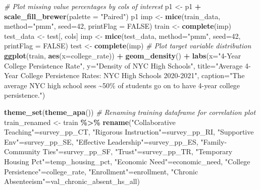 \documentclass[
  man,floatsintext]{apa6}
\newenvironment{Shaded}{\begin{snugshade}}{\end{snugshade}}
\newcommand{\AttributeTok}[1]{\textcolor[rgb]{0.13,0.29,0.53}{#1}}
\newcommand{\CommentTok}[1]{\textcolor[rgb]{0.56,0.35,0.01}{\textit{#1}}}
\newcommand{\ConstantTok}[1]{\textcolor[rgb]{0.56,0.35,0.01}{#1}}
\newcommand{\DecValTok}[1]{\textcolor[rgb]{0.00,0.00,0.81}{#1}}
\newcommand{\FunctionTok}[1]{\textcolor[rgb]{0.13,0.29,0.53}{\textbf{#1}}}
\newcommand{\NormalTok}[1]{#1}
\newcommand{\OtherTok}[1]{\textcolor[rgb]{0.56,0.35,0.01}{#1}}
\newcommand{\SpecialCharTok}[1]{\textcolor[rgb]{0.81,0.36,0.00}{\textbf{#1}}}
\newcommand{\StringTok}[1]{\textcolor[rgb]{0.31,0.60,0.02}{#1}}
\begin{document}
\begin{Shaded}
\begin{Highlighting}[]
\CommentTok{\# Plot missing value percentages by cols of interest}
\NormalTok{p1 }\OtherTok{\textless{}{-}}\NormalTok{ p1 }\SpecialCharTok{+} 
    \FunctionTok{scale\_fill\_brewer}\NormalTok{(}\AttributeTok{palette =} \StringTok{"Paired"}\NormalTok{)}
\NormalTok{p1}
\NormalTok{imp }\OtherTok{\textless{}{-}} \FunctionTok{mice}\NormalTok{(train\_data, }\AttributeTok{method=}\StringTok{"pmm"}\NormalTok{, }\AttributeTok{seed=}\DecValTok{42}\NormalTok{, }\AttributeTok{printFlag =} \ConstantTok{FALSE}\NormalTok{)}
\NormalTok{train }\OtherTok{\textless{}{-}} \FunctionTok{complete}\NormalTok{(imp)}
\NormalTok{test\_data }\OtherTok{\textless{}{-}}\NormalTok{ test[, cols]}
\NormalTok{imp }\OtherTok{\textless{}{-}} \FunctionTok{mice}\NormalTok{(test\_data, }\AttributeTok{method=}\StringTok{"pmm"}\NormalTok{, }\AttributeTok{seed=}\DecValTok{42}\NormalTok{, }\AttributeTok{printFlag =} \ConstantTok{FALSE}\NormalTok{)}
\NormalTok{test }\OtherTok{\textless{}{-}} \FunctionTok{complete}\NormalTok{(imp)}
\CommentTok{\# Plot target variable distribution}
\FunctionTok{ggplot}\NormalTok{(train, }\FunctionTok{aes}\NormalTok{(}\AttributeTok{x=}\NormalTok{college\_rate)) }\SpecialCharTok{+} 
    \FunctionTok{geom\_density}\NormalTok{() }\SpecialCharTok{+} 
    \FunctionTok{labs}\NormalTok{(}\AttributeTok{x=}\StringTok{"4{-}Year College Persistence Rate"}\NormalTok{,}
         \AttributeTok{y=}\StringTok{"Density of NYC High Schools"}\NormalTok{,}
         \AttributeTok{title=}\StringTok{"Average 4{-}Year College Persistence Rates: NYC High Schools 2020{-}2021"}\NormalTok{,}
         \AttributeTok{caption=}\StringTok{"The average NYC high school sees \textasciitilde{}50\% of students go on to have 4{-}year college persistence."}\NormalTok{)}

\FunctionTok{theme\_set}\NormalTok{(}\FunctionTok{theme\_apa}\NormalTok{())}
\CommentTok{\# Renaming training dataframe for correlation plot}
\NormalTok{train\_renamed }\OtherTok{\textless{}{-}}\NormalTok{ train }\SpecialCharTok{\%\textgreater{}\%}
  \FunctionTok{rename}\NormalTok{(}\StringTok{"Collaborative Teaching"}\OtherTok{=}\NormalTok{survey\_pp\_CT,}
         \StringTok{"Rigorous Instruction"}\OtherTok{=}\NormalTok{survey\_pp\_RI,}
         \StringTok{"Supportive Env"}\OtherTok{=}\NormalTok{survey\_pp\_SE,}
         \StringTok{"Effective Leadership"}\OtherTok{=}\NormalTok{survey\_pp\_ES,}
         \StringTok{"Family{-}Community Ties"}\OtherTok{=}\NormalTok{survey\_pp\_SF,}
         \StringTok{"Trust"}\OtherTok{=}\NormalTok{survey\_pp\_TR,}
         \StringTok{"Temporary Housing Pct"}\OtherTok{=}\NormalTok{temp\_housing\_pct,}
         \StringTok{"Economic Need"}\OtherTok{=}\NormalTok{economic\_need,}
         \StringTok{"College Persistence"}\OtherTok{=}\NormalTok{college\_rate,}
         \StringTok{"Enrollment"}\OtherTok{=}\NormalTok{enrollment,}
         \StringTok{"Chronic Absenteeism"}\OtherTok{=}\NormalTok{val\_chronic\_absent\_hs\_all)}


\end{Highlighting}
\end{Shaded}
\end{document}
